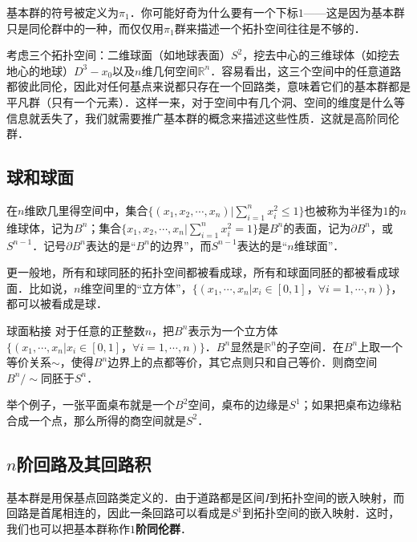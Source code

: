 

基本群的符号被定义为$\pi_1$．你可能好奇为什么要有一个下标$1$——这是因为基本群只是同伦群中的一种，而仅仅用$\pi_1$群来描述一个拓扑空间往往是不够的．

考虑三个拓扑空间：二维球面（如地球表面）$S^2$，挖去中心的三维球体（如挖去地心的地球）$D^3-x_0$以及$n$维几何空间$\mathbb{R}^n$．容易看出，这三个空间中的任意道路都彼此同伦，因此对任何基点来说都只存在一个回路类，意味着它们的基本群都是平凡群（只有一个元素）．这样一来，对于空间中有几个洞、空间的维度是什么等信息就丢失了，我们就需要推广基本群的概念来描述这些性质．这就是高阶同伦群．

\subsection{球和球面}
在$n$维欧几里得空间中，集合$\{(x_1, x_2,\cdots,x_n)|\sum^n_{i=1}x_i^2\leq 1\}$也被称为半径为$1$的$n$维球体，记为$B^n$；集合$\{x_1, x_2, \cdots, x_n|\sum^n_{i=1}x_i^2=1\}$是$B^n$的表面，记为$\partial B^n$，或$S^{n-1}$．记号$\partial B^n$表达的是“$B^n$的边界”，而$S^{n-1}$表达的是“$n$维球面”．

更一般地，所有和球同胚的拓扑空间都被看成球，所有和球面同胚的都被看成球面．比如说，$n$维空间里的“立方体”，$\{(x_1, \cdots, x_n|x_i\in[0, 1]，\forall i=1, \cdots, n)\}$，都可以被看成是球．

\begin{theorem}{球面粘接}
对于任意的正整数$n$，把$B^n$表示为一个立方体$\{(x_1, \cdots, x_n|x_i\in[0, 1]，\forall i=1, \cdots, n)\}$．$B^n$显然是$\mathbb{R}^n$的子空间．在$B^n$上取一个等价关系$\sim$，使得$B^n$边界上的点都等价，其它点则只和自己等价．则商空间$B^n/\sim$同胚于$S^n$．
\end{theorem}

举个例子，一张平面桌布就是一个$B^2$空间，桌布的边缘是$S^1$；如果把桌布边缘粘合成一个点，那么所得的商空间就是$S^2$．

\subsection{$n$阶回路及其回路积}

基本群是用保基点回路类定义的．由于道路都是区间$I$到拓扑空间的嵌入映射，而回路是首尾相连的，因此一条回路可以看成是$S^1$到拓扑空间的嵌入映射．这时，我们也可以把基本群称作$1$\textbf{阶同伦群}．

